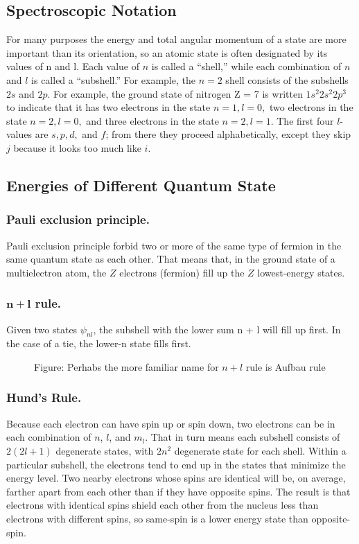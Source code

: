 \documentclass[../../main.tex]{subfiles}
\begin{document}
\subsection{Spectroscopic Notation} 
For many purposes the energy and total angular momentum of a state are more important than its orientation, so an atomic state is often designated by its values of n and l. Each value of $n$ is called a “shell,” while each combination of $n$ and $l$ is called a “subshell.” For example, the $n = 2$ shell consists of the subshells $2s$ and $2p$. For example, the ground state of nitrogen Z = 7 is written $1s^2 2s^2 2p^3$ to indicate that it has two electrons in the state $n = 1, l = 0,$ two electrons in the state $n = 2, l = 0,$ and three electrons in the state $n = 2, l = 1$. The first four $l$-values are $s, p, d,$ and $f$; from there they proceed alphabetically, except they skip $j$ because it looks too much like $i$.

\subsection{Energies of Different Quantum State}
\subsubsection{Pauli exclusion principle.} Pauli exclusion principle forbid two or more of the same type of fermion in the same quantum state as each other. That means that, in the ground state of a multielectron atom, the $Z$ electrons (fermion) fill up the $Z$ lowest-energy states.

\subsubsection{$\boldsymbol{n + l}$ rule.} Given two states $\psi_{nl}$, the subshell with the lower sum n + l will fill up first. In the case of a tie, the lower-n state fills first.
\begin{figure}[b]
    \centering
    \caption*{Figure: Perhabs the more familiar name for $n+l$ rule is Aufbau rule}
\end{figure}

\subsubsection{Hund's Rule.} Because each electron can have spin up or spin down, two electrons can be in each
combination of $n$, $l$, and $m_l$. That in turn means each subshell consists of $2(2l + 1)$ degenerate states, with $2n^2$ degenerate state for each shell. Within a particular subshell, the electrons tend to end up in the states that minimize the energy level. Two nearby electrons whose spins are identical will be, on average, farther apart from each other than if they have opposite spins. The result is that electrons with identical spins shield each other from the nucleus less than electrons with different spins, so same-spin is a lower energy state than opposite-spin.
\end{document}
